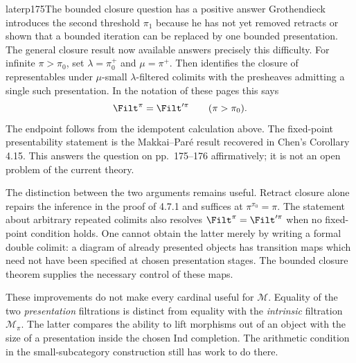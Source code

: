 \begin{dcomment}{later}{p175}{The bounded closure question has a positive answer}
Grothendieck introduces the second threshold $\pi_1$ because he has not yet removed retracts or shown that a bounded iteration can be replaced by one bounded presentation. The general closure result now available answers precisely this difficulty. For infinite $\pi>\pi_0$, set $\lambda=\pi_0^+$ and $\mu=\pi^+$. Then \citet[Corollary 4.13]{Chen2021Sifted} identifies the closure of representables under $\mu$-small $\lambda$-filtered colimits with the presheaves admitting a single such presentation. In the notation of these pages this says
\[
 \Filt^\pi=\Filt'^\pi\qquad(\pi>\pi_0).
\]
The endpoint follows from the idempotent calculation above. The fixed-point presentability statement is the Makkai--Par\'e result recovered in Chen's Corollary 4.15. This answers the question on pp.~175--176 affirmatively; it is not an open problem of the current theory.

The distinction between the two arguments remains useful. Retract closure alone repairs the inference in the proof of 4.7.1 and suffices at $\pi^{\pi_0}=\pi$. The statement about arbitrary repeated colimits also resolves $\Filt^\pi=\Filt'^\pi$ when no fixed-point condition holds. One cannot obtain the latter merely by writing a formal double colimit: a diagram of already presented objects has transition maps which need not have been specified at chosen presentation stages. The bounded closure theorem supplies the necessary control of these maps.

These improvements do not make every cardinal useful for $\mathcal M$. Equality of the two \emph{presentation} filtrations is distinct from equality with the \emph{intrinsic} filtration $\mathcal M_\pi$. The latter compares the ability to lift morphisms out of an object with the size of a presentation inside the chosen Ind completion. The arithmetic condition in the small-subcategory construction still has work to do there.
\end{dcomment}

